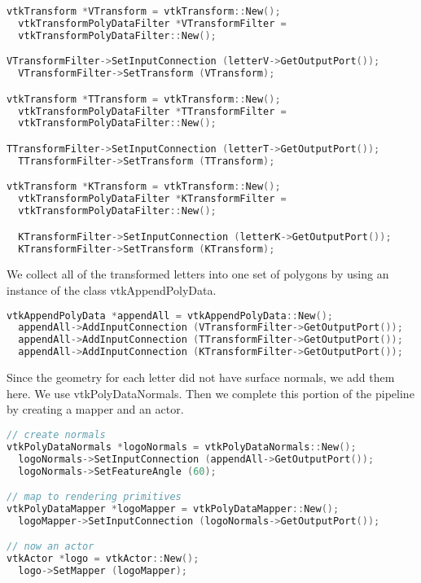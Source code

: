 \begin{lstlisting}[language=C++, caption={Transform each letter into ita appropriate location.}]
vtkTransform *VTransform = vtkTransform::New();
  vtkTransformPolyDataFilter *VTransformFilter =
  vtkTransformPolyDataFilter::New();

VTransformFilter->SetInputConnection (letterV->GetOutputPort());
  VTransformFilter->SetTransform (VTransform);

vtkTransform *TTransform = vtkTransform::New();
  vtkTransformPolyDataFilter *TTransformFilter =
  vtkTransformPolyDataFilter::New();

TTransformFilter->SetInputConnection (letterT->GetOutputPort());
  TTransformFilter->SetTransform (TTransform);

vtkTransform *KTransform = vtkTransform::New();
  vtkTransformPolyDataFilter *KTransformFilter =
  vtkTransformPolyDataFilter::New();

  KTransformFilter->SetInputConnection (letterK->GetOutputPort());
  KTransformFilter->SetTransform (KTransform);
\end{lstlisting}

We collect all of the transformed letters into one set of polygons by using an instance of the class vtkAppendPolyData.

\begin{lstlisting}[language=C++, caption={Collect the transformed letters into one set of polygons.}]
vtkAppendPolyData *appendAll = vtkAppendPolyData::New();
  appendAll->AddInputConnection (VTransformFilter->GetOutputPort());
  appendAll->AddInputConnection (TTransformFilter->GetOutputPort());
  appendAll->AddInputConnection (KTransformFilter->GetOutputPort());
\end{lstlisting}

Since the geometry for each letter did not have surface normals, we add them here. We use vtkPolyDataNormals. Then we complete this portion of the pipeline by creating a mapper and an actor.

\begin{lstlisting}[language=C++, caption={Add surface normals and create mapper and actor.}]
// create normals
vtkPolyDataNormals *logoNormals = vtkPolyDataNormals::New();
  logoNormals->SetInputConnection (appendAll->GetOutputPort());
  logoNormals->SetFeatureAngle (60);

// map to rendering primitives
vtkPolyDataMapper *logoMapper = vtkPolyDataMapper::New();
  logoMapper->SetInputConnection (logoNormals->GetOutputPort());

// now an actor
vtkActor *logo = vtkActor::New();
  logo->SetMapper (logoMapper);
\end{lstlisting}

